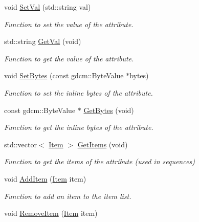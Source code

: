 \begin{DoxyCompactItemize}
void \hyperlink{class_attribute_abdf349cbe232df3425181294b3a3c419}{SetVal} (std::string val)
\begin{DoxyCompactList}\small\item\em Function to set the value of the attribute. \item\end{DoxyCompactList}\item 
std::string \hyperlink{class_attribute_a0bea8bb481e523bfde4a393dddd1caa0}{GetVal} (void)
\begin{DoxyCompactList}\small\item\em Function to get the value of the attribute. \item\end{DoxyCompactList}\item 
void \hyperlink{class_attribute_ab1a4438bd71ef096edce9bf1347b1952}{SetBytes} (const gdcm::ByteValue $\ast$bytes)
\begin{DoxyCompactList}\small\item\em Function to set the inline bytes of the attribute. \item\end{DoxyCompactList}\item 
const gdcm::ByteValue $\ast$ \hyperlink{class_attribute_abf120cf96ec103bdb558b3e40cffa9a0}{GetBytes} (void)
\begin{DoxyCompactList}\small\item\em Function to get the inline bytes of the attribute. \item\end{DoxyCompactList}\item 
std::vector$<$ \hyperlink{class_item}{Item} $>$ \hyperlink{class_attribute_a4bf23c4440b4270e822c21dff30eefb6}{GetItems} (void)
\begin{DoxyCompactList}\small\item\em Function to get the items of the attribute (used in sequences) \item\end{DoxyCompactList}\item 
void \hyperlink{class_attribute_aab36b0fa29276c9f03058a7ff7d8ffbe}{AddItem} (\hyperlink{class_item}{Item} item)
\begin{DoxyCompactList}\small\item\em Function to add an item to the item list. \item\end{DoxyCompactList}\item 
void \hyperlink{class_attribute_a24ac04f4f0c3c2aafd1288990c58351b}{RemoveItem} (\hyperlink{class_item}{Item} item)

\end{DoxyCompactItemize}
